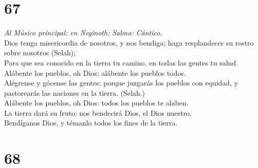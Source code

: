 \hypertarget{section-66}{%
\section{67}\label{section-66}}

 \emph{Al Músico principal: en Neginoth: Salmo: Cántico.}\\
Dios tenga misericordia de nosotros, y nos bendiga; haga resplandecer su
rostro sobre nosotros (Selah);\\
 Para que sea conocido en la tierra tu camino, en todas las
gentes tu salud.\\
 Alábente los pueblos, oh Dios; alábente los pueblos
todos.\\
 Alégrense y gócense las gentes; porque juzgarás los pueblos
con equidad, y pastorearás las naciones en la tierra. (Selah.)\\
 Alábente los pueblos, oh Dios: todos los pueblos te
alaben.\\
 La tierra dará su fruto: nos bendecirá Dios, el Dios
nuestro.\\
 Bendíganos Dios, y témanlo todos los fines de la tierra.

\hypertarget{section-67}{%
\section{68}\label{section-67}}

